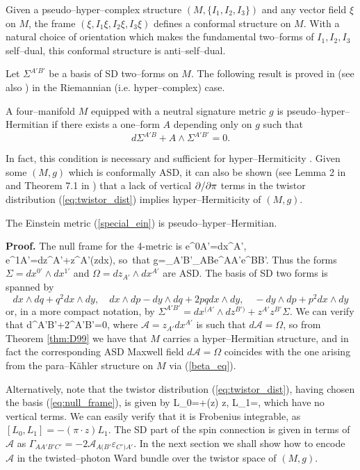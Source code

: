 Given a pseudo--hyper--complex structure $(M,\{I_1,I_2,I_3\})$ and any vector field $\xi$ on $M$, the frame $(\xi,I_1\xi,I_2\xi,I_3\xi)$ defines a conformal structure on $M$. With a natural choice of orientation
which makes the fundamental two--forms of $I_1, I_2, I_3$  self--dual, 
this conformal structure is anti--self--dual.

Let $\Sigma^{A'B'}$ be a basis of SD two--forms on $M$. The following result is proved in \cite{D99} (see also \cite{boyer}) in the Riemannian (i.e. hyper--complex) case.
\begin{theo}[\cite{D99}]\label{thm:D99}
A four--manifold $M$ equipped with a neutral signature metric $g$ is pseudo--hyper--Hermitian if there exists a one--form $A$ depending only on $g$ such that
\[
d\Sigma^{A'B}+A\wedge \Sigma^{A'B'} = 0.
\]
\end{theo}
\noindent In fact, this condition is necessary and sufficient for hyper--Hermiticity \cite{D99,boyer}. Given some $(M,g)$ which is conformally ASD, it can also be shown (see Lemma 2 in \cite{D99} and Theorem  7.1 in \cite{Cal2}) that a lack of vertical $\partial/\partial \pi$ terms in the twistor distribution (\ref{eq:twistor_dist}) implies hyper--Hermiticity of $(M,g)$. %
\begin{prop}
\label{propHH}
The Einstein metric (\ref{special_ein}) is pseudo--hyper--Hermitian.
\end{prop}
\noindent
{\bf Proof.}
The null frame for the 4-metric is
\be \label{eq:null_frame}
e^{0A'}=dx^{A'}, \quad e^{1A'}=dz^{A'}+z^{A'}(z\cdot dx), \quad\mbox{so that}\quad
g=\varepsilon_{A'B'}\varepsilon_{AB}e^{AA'}e^{BB'}.
\ee
Thus the forms $\Sigma=dx^{0'}\wedge dx^{1'}$ and $\Omega=dz_{A'}\wedge dx^{A'}$ are ASD. The basis of SD two forms is spanned by
\[
dx\wedge dq+ q^2 dx\wedge dy,\quad
dx\wedge dp-dy\wedge dq+2 pq dx\wedge dy,
\quad
-dy\wedge dp+ p^2 dx\wedge dy
\]
or, in a more compact notation, by
$\Sigma^{A'B'}=dx^{(A'}\wedge dz^{B')}+z^{A'}z^{B'} \Sigma$.
We can verify that
\be
\label{lie_form}
d\Sigma^{A'B'}+2{{}}\wedge\Sigma^{A'B'}=0,
\ee
where ${{\mathcal A}}= z_{A'}dx^{A'}$ is such that $d{{\mathcal{A}}}= \Omega$,
so from Theorem \ref{thm:D99} we have that $M$ carries a hyper--Hermitian structure, and in fact the corresponding ASD Maxwell field $d\mathcal{A}=\Omega$ coincides with the one arising from the para--K\"ahler structure on $M$ via (\ref{beta_eq}).

Alternatively, note that the twistor distribution (\ref{eq:twistor_dist}), having chosen the basis (\ref{eq:null_frame}), is given by
\be
\label{tdistribution}
L_{0}=\pi\cdot{}+(z\cdot\pi) z\cdot{}, \quad
L_{1}=\pi\cdot{},
\ee
which have no vertical terms. We can easily verify that it is Frobenius integrable, as $[L_{0}, L_{1}]=-(\pi\cdot z)L_{1}$. The SD part of the
spin connection is given in terms of ${\mathcal A}$ as
$\Gamma_{AA'B'C'}=-2{\mathcal A}_{A(B'}\varepsilon_{C')A'}$.
\koniec
In the next section we shall show how to encode
${\mathcal A}$ in the twisted--photon Ward bundle over the twistor space
of $(M, g)$.

